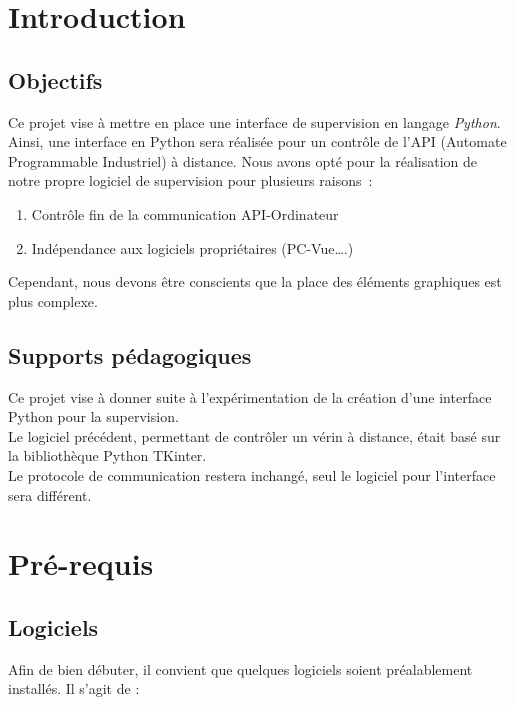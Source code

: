\chapter{Introduction}
\section{Objectifs}


Ce projet vise à mettre en place une interface de supervision en langage \emph{Python}.\newline
Ainsi, une interface en Python sera réalisée pour un contrôle de l’API (Automate Programmable Industriel) à distance. \newline
Nous avons opté pour la réalisation de notre propre logiciel de supervision pour plusieurs raisons : \newline

\begin{enumerate}
\item Contrôle fin de la communication API-Ordinateur
\item Indépendance aux logiciels propriétaires (PC-Vue….) \newline
\end{enumerate} 

Cependant, nous devons être conscients que la place des éléments graphiques est plus complexe.

\section{Supports pédagogiques}

Ce projet vise à donner suite à l'expérimentation de la création d'une interface Python pour la supervision. \\
Le logiciel précédent, permettant de contrôler un vérin à distance, était basé sur la bibliothèque Python TKinter. \\
Le protocole de communication restera inchangé, seul le logiciel pour l'interface sera différent.

\chapter{Pré-requis}
\section{Logiciels}

Afin de bien débuter, il convient que quelques logiciels soient préalablement installés.
Il s'agit de : \newline


